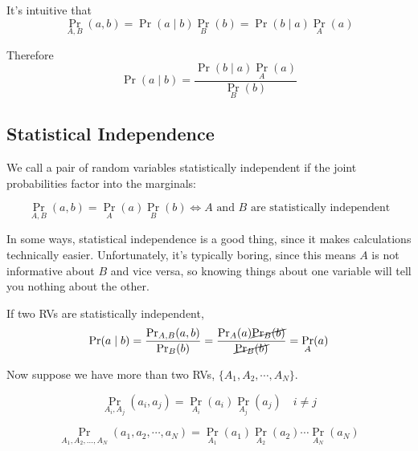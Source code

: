 \documentclass[a4paper,twoside,master.tex]{subfiles}
\begin{document}
It's intuitive that
\begin{equation}
    \Pr_{A,B}(a,b) = \Pr(a\mid b) \Pr_B(b) = \Pr(b\mid a) \Pr_A(a)
\end{equation}

Therefore
\begin{equation}\label{eq:bayes_theorem}
    \Pr(a\mid b) = \frac{\Pr(b\mid a) \Pr_A(a)}{\Pr_B(b)}\tag{Bayes' Theorem}
\end{equation}

\subsection{Statistical Independence}
\label{sub:statistical_independence}

We call a pair of random variables  statistically independent if the joint probabilities factor into the marginals:

\begin{equation}
    \Pr_{A,B}(a,b) = \Pr_A(a) \Pr_B(b) \iff A \text{ and } B \text{ are statistically independent}
\end{equation}

In some ways, statistical independence is a good thing, since it makes calculations technically easier. Unfortunately, it's typically boring, since this means $ A $ is not informative about $ B $ and vice versa, so knowing things about one variable will tell you nothing about the other.

If two RVs are statistically independent,
\begin{equation}
    \Pr(a\mid b) = \frac{\Pr_{A,B}(a,b)}{\Pr_B(b)} = \frac{\Pr_A(a) \cancel{\Pr_B(b)}}{\cancel{\Pr_B(b)}} = \Pr_A(a)
\end{equation}

Now suppose we have more than two RVs, $ \{A_1, A_2, \cdots, A_N\} $.

\begin{definition}
    \begin{equation}
        \Pr_{A_i, A_j}(a_i, a_j) = \Pr_{A_i}(a_i) \Pr_{A_j}(a_j) \quad i \neq j
    \end{equation}
\end{definition}

\begin{definition}
    \begin{equation}
        \Pr_{A_1, A_2, \ldots, A_N}(a_1, a_2,\cdots, a_N) = \Pr_{A_1}(a_1) \Pr_{A_2}(a_2) \cdots \Pr_{A_N}(a_N)
    \end{equation}
\end{definition}
\end{document}
